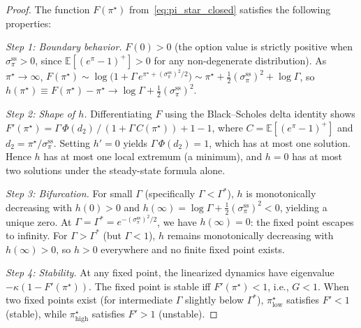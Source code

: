 \begin{proof}
  The function $F(\pi^\star)$ from~\eqref{eq:pi_star_closed} satisfies the
  following properties:

  \emph{Step 1: Boundary behavior.}
  $F(0) > 0$ (the option value is strictly positive when
  $\sigma_\pi^{\mathrm{ss}} > 0$, since $\mathbb{E}[(e^\pi - 1)^+] > 0$ for
  any non-degenerate distribution).  As $\pi^\star \to \infty$,
  $F(\pi^\star) \sim \log\bigl(1 + \Gamma\,
  e^{\pi^\star + (\sigma_\pi^{\mathrm{ss}})^2/2}\bigr) \sim \pi^\star +
  \tfrac{1}{2}(\sigma_\pi^{\mathrm{ss}})^2 + \log\Gamma$,
  so $h(\pi^\star) \equiv F(\pi^\star) - \pi^\star \to
  \log\Gamma + \tfrac{1}{2}(\sigma_\pi^{\mathrm{ss}})^2$.

  \emph{Step 2: Shape of $h$.}
  Differentiating $F$ using the Black--Scholes delta identity shows
  $F'(\pi^\star) = \Gamma\,\Phi(d_2)\,/\,(1 + \Gamma\,C(\pi^\star))
  + 1 - 1$, where
  $C = \mathbb{E}[(e^\pi-1)^+]$ and $d_2 = \pi^\star/\sigma_\pi^{\mathrm{ss}}$.
  Setting $h'=0$ yields $\Gamma\,\Phi(d_2) = 1$, which has at most one
  solution.  Hence $h$ has at most one local extremum (a minimum), and
  $h = 0$ has at most two solutions under the steady-state formula
  alone.

  \emph{Step 3: Bifurcation.}
  For small $\Gamma$ (specifically $\Gamma < \Gamma^*$), $h$ is
  monotonically decreasing with $h(0)>0$ and
  $h(\infty) = \log\Gamma + \tfrac{1}{2}(\sigma_\pi^{\mathrm{ss}})^2 < 0$,
  yielding a unique zero.
  At $\Gamma = \Gamma^* = e^{-(\sigma_\pi^{\mathrm{ss}})^2/2}$,
  we have $h(\infty) = 0$: the fixed point escapes to infinity.
  For $\Gamma > \Gamma^*$ (but $\Gamma < 1$), $h$ remains monotonically
  decreasing with $h(\infty)>0$, so $h>0$ everywhere and no finite
  fixed point exists.

  \emph{Step 4: Stability.}
  At any fixed point, the linearized dynamics have eigenvalue
  $-\kappa(1 - F'(\pi^\star))$.  The fixed point is stable iff
  $F'(\pi^\star) < 1$, i.e., $G < 1$.  When two fixed points exist
  (for intermediate $\Gamma$ slightly below $\Gamma^*$),
  $\pi^\star_{\mathrm{low}}$ satisfies $F' < 1$ (stable), while
  $\pi^\star_{\mathrm{high}}$ satisfies $F' > 1$ (unstable).
\end{proof}

